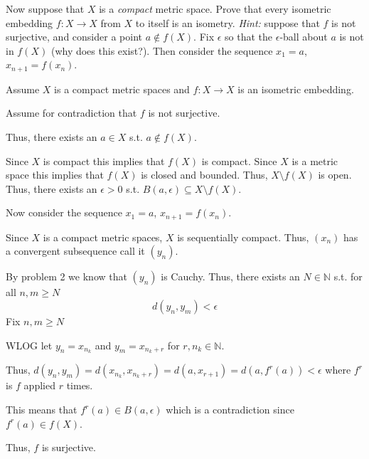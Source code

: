 \documentclass[12pt, letterpaper]{article}
\newcommand{\N}{\mathbb{N}}
\begin{document}
\begin{subproblem}{}
    Now suppose that $X$ is a \emph{compact} metric space. Prove
    that every isometric embedding $f:X \to X$ from $X$ to itself is
    an isometry. \textit{Hint:} suppose that $f$ is not surjective,
    and consider a point $a \notin f(X)$. Fix $\epsilon$ so that the
    $\epsilon$-ball about $a$ is not in $f(X)$ (why does this
    exist?). Then consider the sequence $x_1 = a$,
    $x_{n+1} = f(x_{n})$.
\end{subproblem}
\begin{problemproof}
    Assume $X$ is a compact metric spaces and $f: X \to X$ is an isometric embedding.

    Assume for contradiction that $f$ is not surjective. 
    
    Thus, there exists an $a \in X$ s.t. $a \notin f(X)$.

    Since $X$ is compact this implies that $f(X)$ is compact. Since $X$ is a metric space this implies that $f(X)$ is closed and bounded. Thus, $X \setminus f(X)$ is open. Thus, there exists an $\epsilon >0$ s.t. $B(a,\epsilon) \subseteq X \setminus f(X)$.

    Now consider the sequence $x_1=a$, $x_{n+1}=f(x_n)$.

    Since $X$ is a compact metric spaces, $X$ is sequentially compact. Thus, $(x_n)$ has a convergent subsequence call it $(y_n)$.

    By problem 2 we know that $(y_n)$ is Cauchy. Thus, there exists an $N \in \N$ s.t. for all $n,m \geq N$
    \[d(y_n,y_m) < \epsilon\]
    Fix $n,m \geq N$

    WLOG let $y_n=x_{n_k}$ and $y_m=x_{n_k+r}$ for $r,n_k \in \N$.

    Thus, $d(y_n,y_m)=d(x_{n_k},x_{n_k+r})=d(a,x_{r+1})=d(a,f^r(a)) < \epsilon$ where $f^r$ is $f$ applied $r$ times.

    This means that $f^r(a) \in B(a,\epsilon)$ which is a contradiction since $f^r(a) \in f(X)$.

    Thus, $f$ is surjective.
\end{problemproof}
\end{document}
